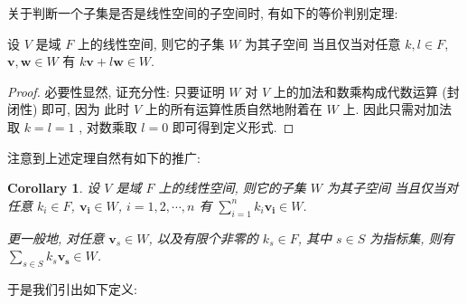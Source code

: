 \documentclass[UTF8]{book}
\newtheorem{corollary}{Corollary}[section]
\begin{document}
关于判断一个子集是否是线性空间的子空间时, 有如下的等价判别定理: 

\begin{theorem}
    设 $V$ 是域 $F$ 上的线性空间, 则它的子集 $W$ 为其子空间
    当且仅当对任意 $k,l\in F$, $\boldsymbol{v},\boldsymbol{w} \in W$ 
    有 $k\boldsymbol{v}+l\boldsymbol{w} \in W$. 
\end{theorem}

\begin{proof}
    必要性显然, 证充分性: 
    只要证明 $W$ 对 $V$ 上的加法和数乘构成代数运算 (封闭性) 即可, 因为
    此时 $V$ 上的所有运算性质自然地附着在 $W$ 上. 
    因此只需对加法取 $k=l=1$ , 对数乘取 $l=0$ 即可得到定义形式. 
\end{proof}

注意到上述定理自然有如下的推广: 

\begin{corollary}
    设 $V$ 是域 $F$ 上的线性空间, 则它的子集 $W$ 为其子空间
    当且仅当对任意 $k_i\in F$, $\boldsymbol{v_i}\in W$, $i=1,2,\cdots,n$ 
    有 $\sum_{i=1}^{n}k_i\boldsymbol{v_i} \in W$. 
    
    更一般地, 对任意 $\boldsymbol{v}_s \in W$, 
    以及有限个非零的 $k_s \in F$, 其中 $s\in S$ 为指标集, 
    则有 $\sum_{s\in S}k_s\boldsymbol{v_s} \in W$.
\end{corollary}

于是我们引出如下定义: 
\end{document}
